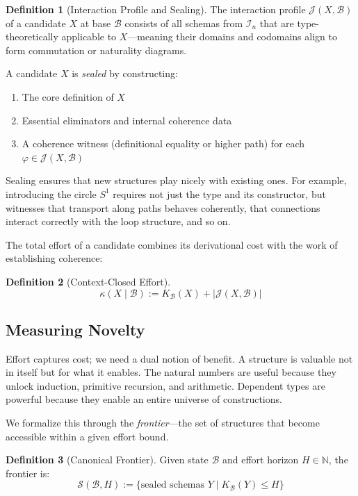 \documentclass[11pt]{article}
\theoremstyle{definition}
\newtheorem{definition}{Definition}
\theoremstyle{plain}
\theoremstyle{remark}
\begin{document}
\begin{definition}[Interaction Profile and Sealing]
The interaction profile $\mathcal{J}(X, \mathcal{B})$ of a candidate $X$ at base $\mathcal{B}$ consists of all schemas from $\mathcal{I}_n$ that are type-theoretically applicable to $X$—meaning their domains and codomains align to form commutation or naturality diagrams.

A candidate $X$ is \emph{sealed} by constructing:
\begin{enumerate}
\item The core definition of $X$
\item Essential eliminators and internal coherence data
\item A coherence witness (definitional equality or higher path) for each $\varphi \in \mathcal{J}(X, \mathcal{B})$
\end{enumerate}
\end{definition}

Sealing ensures that new structures play nicely with existing ones. For example, introducing the circle $S^1$ requires not just the type and its constructor, but witnesses that transport along paths behaves coherently, that connections interact correctly with the loop structure, and so on.

The total effort of a candidate combines its derivational cost with the work of establishing coherence:

\begin{definition}[Context-Closed Effort]
\[
\kappa(X \mid \mathcal{B}) := K_{\mathcal{B}}(X) + |\mathcal{J}(X, \mathcal{B})|
\]
\end{definition}

\subsection{Measuring Novelty}

Effort captures cost; we need a dual notion of benefit. A structure is valuable not in itself but for what it enables. The natural numbers are useful because they unlock induction, primitive recursion, and arithmetic. Dependent types are powerful because they enable an entire universe of constructions.

We formalize this through the \emph{frontier}—the set of structures that become accessible within a given effort bound.

\begin{definition}[Canonical Frontier]
Given state $\mathcal{B}$ and effort horizon $H \in \mathbb{N}$, the frontier is:
\[
\mathcal{S}(\mathcal{B}, H) := \{\text{sealed schemas } Y \mid K_{\mathcal{B}}(Y) \leq H\}
\]
\end{definition}
\end{document}
